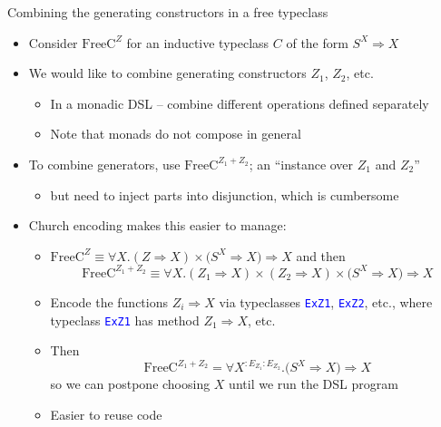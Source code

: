 \documentclass[english,,russian]{beamer}
\begin{document}
\begin{frame}{Combining the generating constructors in a free typeclass}
\begin{itemize}
\item Consider $\text{FreeC}^{Z}$ for an inductive typeclass $C$ of the
form $S^{X}\Rightarrow X$
\item We would like to combine generating constructors $Z_{1}$, $Z_{2}$,
etc.
\begin{itemize}
\item In a monadic DSL -- combine different operations defined separately
\item Note that monads do not compose in general
\end{itemize}
\item To combine generators, use $\text{FreeC}^{Z_{1}+Z_{2}}$; an ``instance
over $Z_{1}$ and $Z_{2}$''
\begin{itemize}
\item but need to inject parts into disjunction, which is cumbersome
\end{itemize}
\item Church encoding makes this easier to manage:
\begin{itemize}
\item {\footnotesize{}$\text{FreeC}^{Z}\equiv\forall X.\left(Z\Rightarrow X\right)\times\big(S^{X}\Rightarrow X\big)\Rightarrow X$}
and then {\footnotesize{}
\[
\text{FreeC}^{Z_{1}+Z_{2}}\equiv\forall X.\left(Z_{1}\Rightarrow X\right)\times\left(Z_{2}\Rightarrow X\right)\times\big(S^{X}\Rightarrow X\big)\Rightarrow X
\]
}{\footnotesize\par}
\item Encode the functions $Z_{i}\Rightarrow X$ via typeclasses \texttt{\textcolor{blue}{\footnotesize{}ExZ1}},
\texttt{\textcolor{blue}{\footnotesize{}ExZ2}}, etc., where typeclass
\texttt{\textcolor{blue}{\footnotesize{}ExZ1}} has method $Z_{1}\Rightarrow X$,
etc.
\item Then {\footnotesize{}
\[
\text{FreeC}^{Z_{1}+Z_{2}}=\forall X^{:E_{Z_{1}}:E_{Z_{2}}}.\big(S^{X}\Rightarrow X\big)\Rightarrow X
\]
}so we can postpone choosing $X$ until we run the DSL program
\item Easier to reuse code
\end{itemize}
\end{itemize}
\end{frame}
\end{document}
